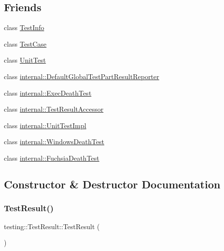 \subsection*{Friends}
\begin{DoxyCompactItemize}
\item 
class \mbox{\hyperlink{classtesting_1_1TestResult_a4c49c2cdb6c328e6b709b4542f23de3c}{Test\+Info}}
\item 
class \mbox{\hyperlink{classtesting_1_1TestResult_aff779e55b06adfa7c0088bd10253f0f0}{Test\+Case}}
\item 
class \mbox{\hyperlink{classtesting_1_1TestResult_a832b4d233efee1a32feb0f4190b30d39}{Unit\+Test}}
\item 
class \mbox{\hyperlink{classtesting_1_1TestResult_abae39633da9932847b41cb80efd62115}{internal\+::\+Default\+Global\+Test\+Part\+Result\+Reporter}}
\item 
class \mbox{\hyperlink{classtesting_1_1TestResult_adf5553cae6aea6f8648d47e299237e34}{internal\+::\+Exec\+Death\+Test}}
\item 
class \mbox{\hyperlink{classtesting_1_1TestResult_ae762da04e74a0d3b0daded3c5bd4a8e8}{internal\+::\+Test\+Result\+Accessor}}
\item 
class \mbox{\hyperlink{classtesting_1_1TestResult_acc0a5e7573fd6ae7ad1878613bb86853}{internal\+::\+Unit\+Test\+Impl}}
\item 
class \mbox{\hyperlink{classtesting_1_1TestResult_a6aeedc04a0590fcc1b3c5f687dbb0f9f}{internal\+::\+Windows\+Death\+Test}}
\item 
class \mbox{\hyperlink{classtesting_1_1TestResult_af29d5921f68031cdfba0b28cf4b3b559}{internal\+::\+Fuchsia\+Death\+Test}}
\end{DoxyCompactItemize}


\subsection{Constructor \& Destructor Documentation}
\mbox{\label{classtesting_1_1TestResult_a5cf5dd6f416b7334ea601aab21a2fda5}} 
\subsubsection{\texorpdfstring{TestResult()}{TestResult()}}
{\footnotesize\ttfamily testing\+::\+Test\+Result\+::\+Test\+Result (\begin{DoxyParamCaption}{ }\end{DoxyParamCaption})}

